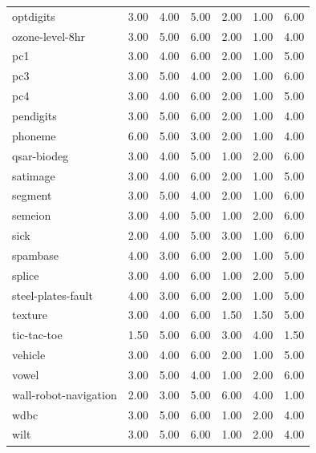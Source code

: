 \begin{table}[htbp]
\begin{tabular}{lrrrrrr}
optdigits & 3.00 & 4.00 & 5.00 & 2.00 & 1.00 & 6.00 \\
ozone-level-8hr & 3.00 & 5.00 & 6.00 & 2.00 & 1.00 & 4.00 \\
pc1 & 3.00 & 4.00 & 6.00 & 2.00 & 1.00 & 5.00 \\
pc3 & 3.00 & 5.00 & 4.00 & 2.00 & 1.00 & 6.00 \\
pc4 & 3.00 & 4.00 & 6.00 & 2.00 & 1.00 & 5.00 \\
pendigits & 3.00 & 5.00 & 6.00 & 2.00 & 1.00 & 4.00 \\
phoneme & 6.00 & 5.00 & 3.00 & 2.00 & 1.00 & 4.00 \\
qsar-biodeg & 3.00 & 4.00 & 5.00 & 1.00 & 2.00 & 6.00 \\
satimage & 3.00 & 4.00 & 6.00 & 2.00 & 1.00 & 5.00 \\
segment & 3.00 & 5.00 & 4.00 & 2.00 & 1.00 & 6.00 \\
semeion & 3.00 & 4.00 & 5.00 & 1.00 & 2.00 & 6.00 \\
sick & 2.00 & 4.00 & 5.00 & 3.00 & 1.00 & 6.00 \\
spambase & 4.00 & 3.00 & 6.00 & 2.00 & 1.00 & 5.00 \\
splice & 3.00 & 4.00 & 6.00 & 1.00 & 2.00 & 5.00 \\
steel-plates-fault & 4.00 & 3.00 & 6.00 & 2.00 & 1.00 & 5.00 \\
texture & 3.00 & 4.00 & 6.00 & 1.50 & 1.50 & 5.00 \\
tic-tac-toe & 1.50 & 5.00 & 6.00 & 3.00 & 4.00 & 1.50 \\
vehicle & 3.00 & 4.00 & 6.00 & 2.00 & 1.00 & 5.00 \\
vowel & 3.00 & 5.00 & 4.00 & 1.00 & 2.00 & 6.00 \\
wall-robot-navigation & 2.00 & 3.00 & 5.00 & 6.00 & 4.00 & 1.00 \\
wdbc & 3.00 & 5.00 & 6.00 & 1.00 & 2.00 & 4.00 \\
wilt & 3.00 & 5.00 & 6.00 & 1.00 & 2.00 & 4.00 \\
\hline
\end{tabular}
\end{table}
